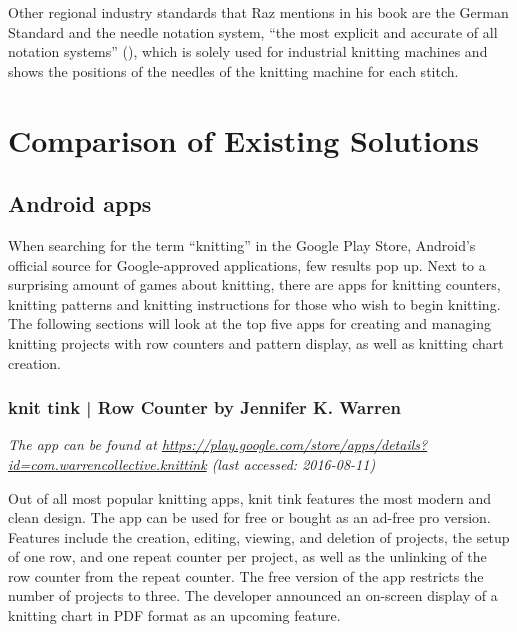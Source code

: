 Other regional industry standards that Raz mentions in his book are the German Standard and the needle notation system, ``the most explicit and accurate of all  notation systems'' (\cite[p58]{Raz1993}), which is solely used for industrial knitting machines and shows the positions of the needles of the knitting machine for each stitch.

\section{Comparison of Existing Solutions}

\subsection{Android apps}
When searching for the term ``knitting'' in the Google Play Store, Android’s official source for Google-approved applications, few results pop up. Next to a surprising amount of games about knitting, there are apps for knitting counters, knitting patterns and knitting instructions for those who wish to begin knitting. The following sections will look at the top five apps for creating and managing knitting projects with row counters and pattern display, as well as knitting chart creation.

\subsubsection*{knit tink | Row Counter by Jennifer K. Warren}

\textit{ The app can be found at \url{https://play.google.com/store/apps/details?id=com.warrencollective.knittink} \small{(last accessed: 2016-08-11)}}
\vspace*{0.5cm}

\noindent Out of all most popular knitting apps, knit tink features the most modern and clean design. The app can be used for free or bought as an ad-free pro version. Features include the creation, editing, viewing, and deletion of projects, the setup of one row, and one repeat counter per project, as well as the unlinking of the row counter from the repeat counter. The free version of the app restricts the number of projects to three. The developer announced an on-screen display of a knitting chart in PDF format as an upcoming feature.

